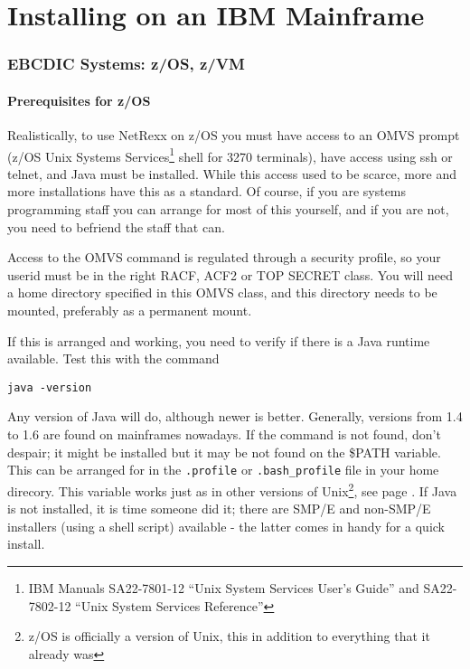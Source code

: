 \chapter{Installing on an IBM Mainframe}
\subsection{EBCDIC Systems: z/OS, z/VM}

\subsubsection{Prerequisites for z/OS}
Realistically, to use NetRexx on z/OS you must have access to an OMVS
prompt (z/OS Unix Systems Services\footnote{IBM Manuals SA22-7801-12 ``Unix System
  Services User's Guide''
  and  SA22-7802-12 ``Unix System Services Reference''}  shell for 3270 terminals), have
access using ssh or telnet, and Java must be installed. While this
access used to be scarce, more and more installations have this as a
standard. Of course, if you are systems programming staff you can
arrange for most of this yourself, and if you are not, you need to
befriend the staff that can.

Access to the OMVS command is regulated through a security profile, so your userid
must be in the right RACF, ACF2 or TOP SECRET class. You will need a home
directory specified in this OMVS class, and this directory needs to be
mounted, preferably as a permanent mount.

If this is arranged and working, you need to verify if there is a Java
runtime available. Test this with the command 
\begin{verbatim}
java -version
\end{verbatim}
Any version of Java will do, although newer is better. Generally,
versions from 1.4 to 1.6 are found on mainframes nowadays. If the
command is not found, don't despair; it might be installed but it may
be not found on the \$PATH variable. This can be arranged for in the
\texttt{.profile} or \texttt{.bash\_profile} file in your home direcory. This variable works
just as in other versions of Unix\footnote{z/OS is officially a
  version of Unix, this in addition to everything that it already was}, see
page \pageref{install_classpath}. If Java is not installed, it is time
someone did it; there are SMP/E and non-SMP/E installers (using a
shell script) available -
the latter comes in handy for a quick install.

